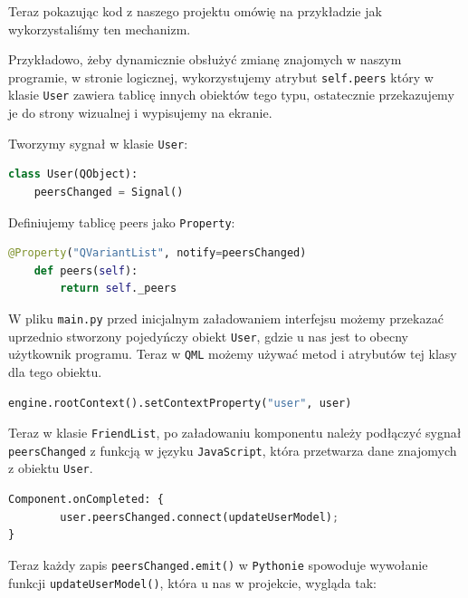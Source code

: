 Teraz pokazując kod z naszego projektu omówię na przykładzie jak wykorzystaliśmy ten mechanizm.

Przykładowo, żeby dynamicznie obsłużyć zmianę znajomych w naszym programie, w stronie logicznej, wykorzystujemy atrybut \texttt{self.peers} który w klasie \texttt{User} zawiera tablicę innych obiektów tego typu, ostatecznie przekazujemy je do strony wizualnej i wypisujemy na ekranie.

Tworzymy sygnał w klasie \texttt{User}:
\begin{lstlisting}[language=Python, caption={Sygnał User}]
class User(QObject):
    peersChanged = Signal()
\end{lstlisting}    

Definiujemy tablicę peers jako \texttt{Property}:
\begin{lstlisting}[language=Python, caption={Peers Property}]
@Property("QVariantList", notify=peersChanged)
    def peers(self):
        return self._peers
\end{lstlisting}

W pliku \texttt{main.py} przed inicjalnym załadowaniem interfejsu możemy przekazać uprzednio stworzony pojedyńczy obiekt \texttt{User}, gdzie u nas jest to obecny użytkownik programu. Teraz w \texttt{QML} możemy używać metod i atrybutów tej klasy dla tego obiektu.

\begin{lstlisting}[language=Python, caption={Przekazanie inicjalnego obiektu}]
engine.rootContext().setContextProperty("user", user)
\end{lstlisting}

Teraz w klasie \texttt{FriendList}, po załadowaniu komponentu należy podłączyć sygnał \texttt{peersChanged} z funkcją w języku \texttt{JavaScript}, która przetwarza dane znajomych z obiektu \texttt{User}.

\begin{lstlisting}[language=Python, caption={Podłączenie sygnału do slota w QML}]
Component.onCompleted: {
        user.peersChanged.connect(updateUserModel);
}
\end{lstlisting}
Teraz każdy zapis \texttt{peersChanged.emit()} w \texttt{Pythonie} spowoduje wywołanie funkcji \texttt{updateUserModel()}, która u nas w projekcie, wygląda tak:

